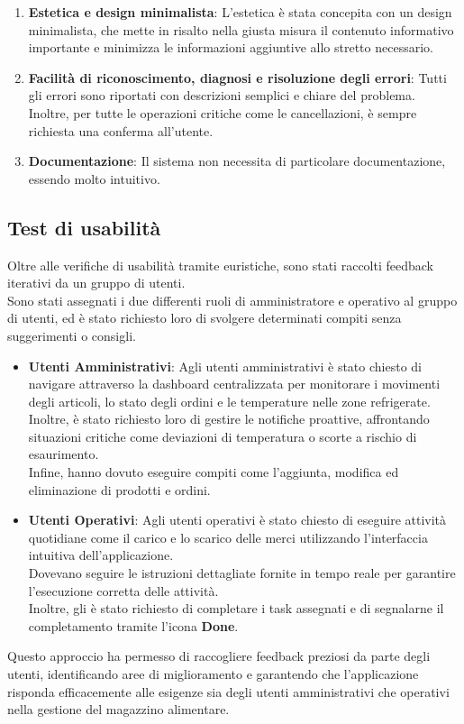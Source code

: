 \begin{enumerate}
    \item \textbf{Estetica e design minimalista}: L’estetica è stata concepita con un design minimalista, che mette in risalto nella giusta misura il contenuto informativo importante e minimizza le informazioni aggiuntive allo stretto necessario.

    \item \textbf{Facilità di riconoscimento, diagnosi e risoluzione degli errori}: Tutti gli errori sono riportati con descrizioni semplici e chiare del problema.\\ Inoltre, per tutte le operazioni critiche come le cancellazioni, è sempre richiesta una conferma all’utente.

    \item \textbf{Documentazione}: Il sistema non necessita di particolare documentazione, essendo molto intuitivo.
\end{enumerate}

\subsection{Test di usabilità}
Oltre alle verifiche di usabilità tramite euristiche, sono stati raccolti feedback iterativi da un gruppo di utenti.\\
Sono stati assegnati i due differenti ruoli di amministratore e operativo al gruppo di utenti, ed è stato richiesto
loro di svolgere determinati compiti senza suggerimenti o consigli.\\

\begin{itemize}
    \item \textbf{Utenti Amministrativi}: Agli utenti amministrativi è stato chiesto di navigare attraverso la dashboard centralizzata per monitorare i movimenti degli articoli, lo stato degli ordini e le temperature nelle zone refrigerate.\\ Inoltre, è stato richiesto loro di gestire le notifiche proattive, affrontando situazioni critiche come deviazioni di temperatura o scorte a rischio di esaurimento.\\ Infine, hanno dovuto eseguire compiti come l'aggiunta, modifica ed eliminazione di prodotti e ordini.

    \item \textbf{Utenti Operativi}: Agli utenti operativi è stato chiesto di eseguire attività quotidiane come il carico e lo scarico delle merci utilizzando l'interfaccia intuitiva dell'applicazione.\\ Dovevano seguire le istruzioni dettagliate fornite in tempo reale per garantire l'esecuzione corretta delle attività.\\ Inoltre, gli è stato richiesto di completare i task assegnati e di segnalarne il completamento tramite l'icona \textbf{Done}.
\end{itemize}

Questo approccio ha permesso di raccogliere feedback preziosi da parte degli utenti, identificando aree di
miglioramento e garantendo che l'applicazione risponda efficacemente alle esigenze sia degli utenti amministrativi
che operativi nella gestione del magazzino alimentare.

